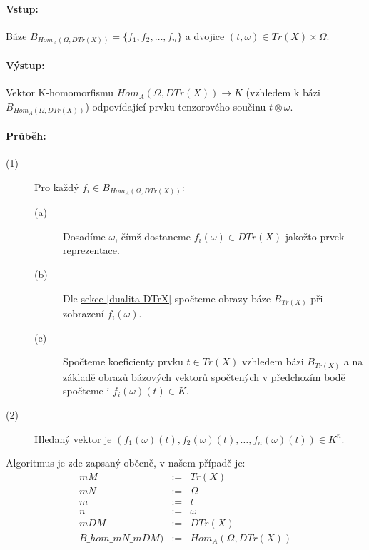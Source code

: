       \paragraph{Vstup:} Báze $B_{Hom_A(\Omega,DTr(X))}=\{f_1,f_2,\ldots,f_n\}$ a  
      dvojice $(t,\omega)\in Tr(X)\times\Omega$.
      \paragraph{Výstup:} Vektor  K-homomorfismu 
      $Hom_A(\Omega,DTr(X))\rightarrow K$ (vzhledem k bázi  
      $B_{Hom_A(\Omega,DTr(X))}$) odpovídající 
      prvku tenzorového součinu $t\otimes\omega$.
      \paragraph{Průběh:}
      \begin{description}
        \item[(1)]Pro každý $f_i\in B_{Hom_A(\Omega,DTr(X))}$:  
          \begin{description} 
             \item[(a)] Dosadíme $\omega$, čímž dostaneme $f_i(\omega)\in DTr(X)$ 
             jakožto prvek reprezentace.
             \item[(b)] Dle \hyperref[dualita-DTrX]{sekce \ref*{dualita-DTrX}} 
             spočteme obrazy báze $B_{Tr(X)}$ při zobrazení $f_i(\omega)$. 
             \item[(c)] Spočteme koeficienty prvku $t\in Tr(X)$ vzhledem bázi 
             $B_{Tr(X)}$ a na základě obrazů bázových vektorů spočtených v 
             předchozím bodě spočteme i $f_i(\omega)(t)\in K$. 
          \end{description}
        \item[(2)] Hledaný vektor je $(f_1(\omega)(t),f_2(\omega)(t),\ldots,f_n(\omega)(t))\in K^n$. 
      \end{description} 
                 
      Algoritmus je zde zapsaný oběcně, v našem případě je: 
      \begin{eqnarray}
        mM &:=& Tr(X)   \nonumber \\
        mN &:=&  \Omega \nonumber \\
        m &:=& t   \nonumber \\
        n &:=& \omega   \nonumber \\
        mDM &:=& DTr(X) \nonumber \\
        B\_hom\_mN\_mDM) &:=& Hom_A(\Omega, DTr(X)) \nonumber
      \end{eqnarray}
      
